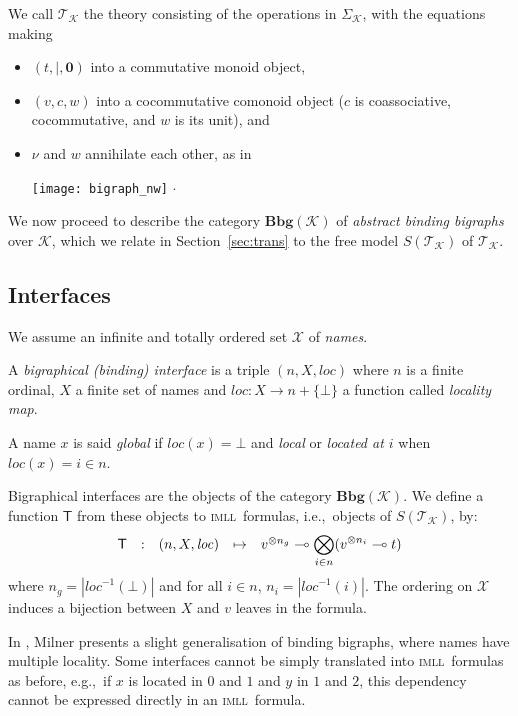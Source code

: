\documentclass{llncs}
\newcommand{\intro}[1]{\emph{#1}}
\newcommand{\cat}[1]{\mathbf{#1}}
\newcommand{\fonc}[1]{\mathsf{#1}}
\newcommand{\ie}{i.e.,}
\newcommand{\eg}{e.g.,}
\newcommand{\bsig}{\mathcal{K}} \newcommand{\model}{\mathcal{L}} \newcommand{\bbig}{\cat{Bbg}} \newcommand{\T}{\fonc{T}} \newcommand{\theory}{\mathcal{T}}
\newcommand{\sig}{\Sigma}
\newcommand{\X}{\mathcal{X}}
\newcommand{\imll}{\textsc{imll}}
\newcommand{\loc}{\mathit{loc}}
\newcommand{\zero}{\mathbf{0}}
\newcommand{\paral}{\mid}
\newcommand{\impll}{\multimap}
\newcommand{\tens}{\otimes}
\newcommand{\bigtens}{\bigotimes}
\newcommand{\Bigtens}[1]{\displaystyle{\bigtens_{#1}}}
\newcommand{\card}[1]{|#1|}
\begin{document}
We call $\theory_\bsig$ the theory consisting
of the operations in $\sig_\bsig$, with the equations making
\begin{itemize}
\item $(t, \paral, \zero)$ into a commutative monoid object, 
\item $(v, c, w)$ into a cocommutative comonoid object ($c$ is
  coassociative, cocommutative, and $w$ is its unit), and
\item $\nu$ and $w$ annihilate each other, as in
	\begin{center}
	    \texttt{[image: bigraph\_nw]} $\cdot$
	\end{center}
\end{itemize}
We now proceed to describe the category $\bbig(\bsig)$ of
\emph{abstract binding bigraphs} over $\bsig$, which we relate in
Section~\ref{sec:trans} to the free model $S (\theory_\bsig)$ of
$\theory_\bsig$.

\subsection{Interfaces}
We assume an infinite and totally ordered set $\X$ of \emph{names}. 

\begin{definition}
  A \intro{bigraphical (binding) interface} is a triple $(
  n,X,\loc )$ where $n$ is a finite ordinal, $X$ a finite set of
  names and $\loc: X \to n + \{ \bot \}$ a function
  called \intro{locality map}.
\end{definition}
A name $x$ is said \emph{global} if $\loc(x) = \bot$ and \emph{local} or
\emph{located at $i$} when $\loc(x) = i \in n$.

Bigraphical interfaces are the objects of the category $\bbig(\bsig)$.
We define a function $\T$ from these objects to \imll\ formulas, \ie\
objects of $S (\theory_\bsig)$, by:
\begin{equation}
\begin{array}{c c c c c}
    \T & : & ( n,X,\loc) & \mapsto & v^{\tens n_g} \impll \Bigtens{i \in n} ( v^{\tens n_i} \impll t) 
  \end{array}\label{eq:T:ob}
\end{equation}
  where $n_g = \card{\loc^{-1}(\bot)}$ and for all $i \in n$, $n_i =
  \card{\loc^{-1}(i)}$.
  The ordering on $\X$ induces a bijection between $X$ and  $v$ leaves in the formula. 

In \cite{Milner:bigraphs2}, Milner presents a slight generalisation of binding
bigraphs, where names have multiple locality.
Some interfaces cannot be simply translated into \imll\ formulas as before,
\eg\ if $x$ is located in $0$ and $1$ and $y$ in $1$ and $2$, this dependency
cannot be expressed directly in an \imll\ formula.
\end{document}
